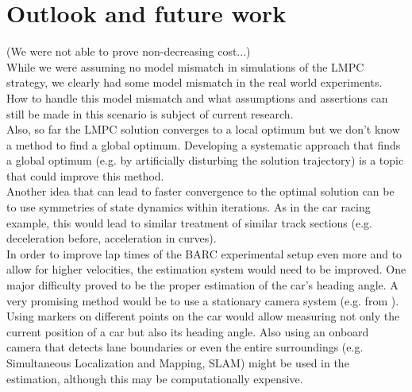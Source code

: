 
\section{Outlook and future work}
(We were not able to prove non-decreasing cost...)\\
While we were assuming no model mismatch in simulations of the LMPC strategy, we clearly had some model mismatch in the real world experiments. How to handle this model mismatch and what assumptions and assertions can still be made in this scenario is subject of current research.\\
Also, so far the LMPC solution converges to a local optimum but we don't know a method to find a global optimum. Developing a systematic approach that finds a global optimum (e.g. by artificially disturbing the solution trajectory) is a topic that could improve this method.\\
Another idea that can lead to faster convergence to the optimal solution can be to use symmetries of state dynamics within iterations. As in the car racing example, this would lead to similar treatment of similar track sections (e.g. deceleration before, acceleration in curves).\\
In order to improve lap times of the BARC experimental setup even more and to allow for higher velocities, the estimation system would need to be improved. One major difficulty proved to be the proper estimation of the car's heading angle. A very promising method would be to use a stationary camera system (e.g. from \cite{Liniger2015}). Using markers on different points on the car would allow measuring not only the current position of a car but also its heading angle. Also using an onboard camera that detects lane boundaries or even the entire surroundings (e.g. Simultaneous Localization and Mapping, SLAM) might be used in the estimation, although this may be computationally expensive.\\

